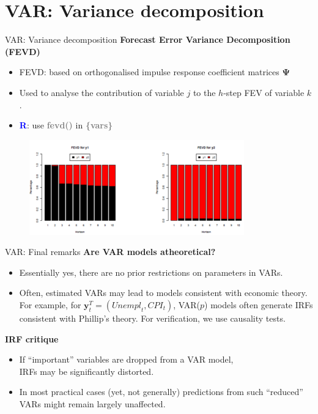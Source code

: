 \documentclass[usenames,dvipsnames]{beamer}
\begin{document}
\section{VAR: Variance decomposition}
\begin{frame}{VAR: Variance decomposition}
\textbf{Forecast Error Variance Decomposition (FEVD)}\\
\medskip
\begin{itemize}
\item FEVD: based on orthogonalised impulse response coefficient matrices $\bm{\Psi}$
\item Used to analyse the contribution of variable $j$ to the $h$-step FEV of variable $k$.
\item \textcolor{Blue}{\textbf{R}}: use \textbf{\textcolor{Gray}{fevd()}} in \textbf{\textcolor{Gray}{\{vars\}}}
\end{itemize}
\vspace*{-6mm}
\begin{figure}
\includegraphics[width=\textwidth, height=4.1cm]{./img/P10_Obrazek_6}
\end{figure}
\end{frame}
\begin{frame}{VAR: Final remarks}
\textbf{Are VAR models atheoretical?}\\
\begin{itemize}
\item Essentially yes, there are no prior restrictions on parameters in VARs.
\item Often, estimated VARs may lead to models consistent with economic theory. For example, for $\bm{y}_t^T = (\textit{Unempl}_t, \textit{CPI}_t)$, VAR($p$) models often generate IRFs consistent with Phillip’s theory. For verification, we use causality tests.\\
\end{itemize}
\medskip
\textbf{IRF critique}\\
\begin{itemize}
\item If ``important'' variables are dropped from a VAR model,\\IRFs may be significantly distorted.
\item In most practical cases (yet, not generally) predictions from such ``reduced'' VARs might remain largely unaffected.
\end{itemize}
\end{frame}
\end{document}
